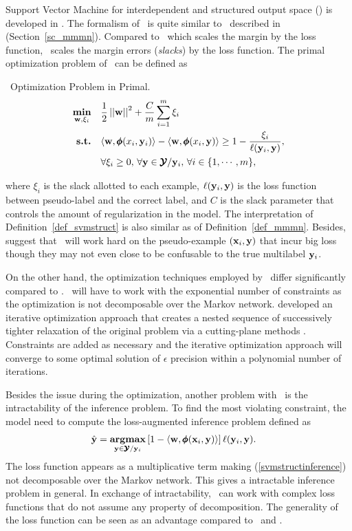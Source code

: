 {Support Vector Machine for interdependent and structured output space (\svmstruct) is developed in \citep{THJA04,TJTA05}.
The formalism of \svmstruct\ is quite similar to \mmmn\ described in (Section~\ref{sc_mmmn}).
Compared to \mmmn\ which scales the margin by the loss function, \svmstruct\ scales the margin errors ({\em slacks}) by the loss function.
The primal optimization problem of \svmstruct\ can be defined as
\begin{definition}{\svmstruct\ Optimization Problem in Primal.}\label{def_svmstruct}
	\begin{align*}
		\underset{\mathbf {w},\xi_i}{\textbf{min}} & \quad\frac{1}{2}\left|\left| \mathbf {w} \right|\right|^2 + \frac{C}{m}\sum_{i=1}^{m}\xi_i \\
		\textbf{s.t.} & \quad\langle \mathbf {w}, \pmb \phi(x_i,\mathbf {y}_i) \rangle - \langle \mathbf {w}, \pmb \phi(x_i,\mathbf {y}) \rangle \ge 1-\frac{\xi_i}{\mathbf {\ell}(\mathbf {y}_i,\mathbf {y})},\\
		& \quad \forall \xi_i\ge0,\, \forall \mathbf {y}\in\pmb {\mathcal{Y}}/\mathbf {y}_i,\, \forall i\in\{1,\cdots,m\},
	\end{align*}
\end{definition}
where $\xi_i$ is the slack allotted to each example, $\mathbf {\ell}(\mathbf {y}_i,\mathbf {y})$ is the loss function between pseudo-label and the correct label, and $C$ is the slack parameter that controls the amount of regularization in the model.
The interpretation of Definition~\ref{def_svmstruct} is also similar as of Definition~\ref{def_mmmn}.
Besides, \citet{THJA04} suggest that \mmmn\ will work hard on the pseudo-example $(\mathbf {x}_i,\mathbf {y})$ that incur big loss though they may not even close to be confusable to the true multilabel $\mathbf {y}_i$.

On the other hand, the optimization techniques employed by \svmstruct\ differ significantly compared to \mmmn.
\svmstruct\ will have to work with the exponential number of constraints as the optimization is not decomposable over the Markov network.
\citet{THJA04} developed an iterative optimization approach that creates a nested sequence of successively tighter relaxation of the original problem via a cutting-plane methods \citep{Bishop07,JFY09}.
Constraints are added as necessary and the iterative optimization approach will converge to some optimal solution of $\epsilon$ precision within a polynomial number of iterations.

Besides the issue during the optimization, another problem with \svmstruct\ is the intractability of the inference problem.
To find the most violating constraint, the model need to compute the loss-augmented inference problem \citep{TJTA05} defined as
\begin{align}
	\hat{\mathbf {y}} = \underset{\mathbf {y}\in\pmb {\mathcal{Y}}/\mathbf {y}_i}{\textbf{argmax}} &\, [1-\langle \mathbf {w}, \pmb \phi(\mathbf {x}_i,\mathbf {y}) \rangle]\,\mathbf {\ell}(\mathbf {y}_i,\mathbf {y}). \label{svmstructinference}
\end{align}
The loss function appears as a multiplicative term making (\ref{svmstructinference}) not decomposable over the Markov network.
This gives a intractable inference problem in general.
In exchange of intractability, \svmstruct\ can work with complex loss functions that do not assume any property of decomposition.
The generality of the loss function can be seen as an advantage compared to \crf\ and \mmmn.





}
